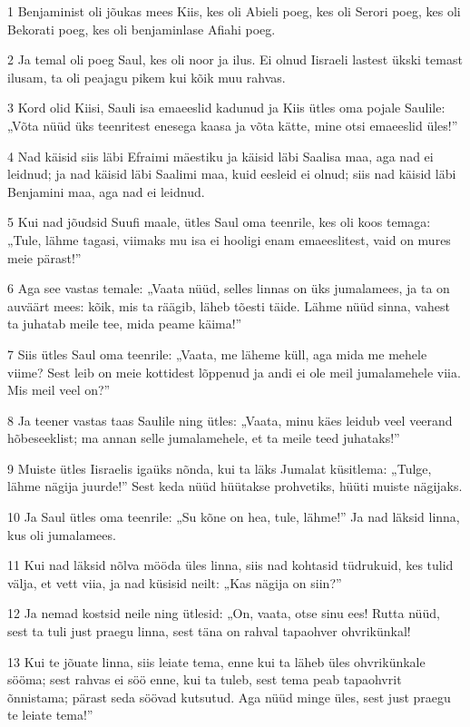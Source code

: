 \par 1 Benjaminist oli jõukas mees Kiis, kes oli Abieli poeg, kes oli Serori poeg, kes oli Bekorati poeg, kes oli benjaminlase Afiahi poeg.
\par 2 Ja temal oli poeg Saul, kes oli noor ja ilus. Ei olnud Iisraeli lastest ükski temast ilusam, ta oli peajagu pikem kui kõik muu rahvas.
\par 3 Kord olid Kiisi, Sauli isa emaeeslid kadunud ja Kiis ütles oma pojale Saulile: „Võta nüüd üks teenritest enesega kaasa ja võta kätte, mine otsi emaeeslid üles!”
\par 4 Nad käisid siis läbi Efraimi mäestiku ja käisid läbi Saalisa maa, aga nad ei leidnud; ja nad käisid läbi Saalimi maa, kuid eesleid ei olnud; siis nad käisid läbi Benjamini maa, aga nad ei leidnud.
\par 5 Kui nad jõudsid Suufi maale, ütles Saul oma teenrile, kes oli koos temaga: „Tule, lähme tagasi, viimaks mu isa ei hooligi enam emaeeslitest, vaid on mures meie pärast!”
\par 6 Aga see vastas temale: „Vaata nüüd, selles linnas on üks jumalamees, ja ta on auväärt mees: kõik, mis ta räägib, läheb tõesti täide. Lähme nüüd sinna, vahest ta juhatab meile tee, mida peame käima!”
\par 7 Siis ütles Saul oma teenrile: „Vaata, me läheme küll, aga mida me mehele viime? Sest leib on meie kottidest lõppenud ja andi ei ole meil jumalamehele viia. Mis meil veel on?”
\par 8 Ja teener vastas taas Saulile ning ütles: „Vaata, minu käes leidub veel veerand hõbeseeklist; ma annan selle jumalamehele, et ta meile teed juhataks!”
\par 9 Muiste ütles Iisraelis igaüks nõnda, kui ta läks Jumalat küsitlema: „Tulge, lähme nägija juurde!” Sest keda nüüd hüütakse prohvetiks, hüüti muiste nägijaks.
\par 10 Ja Saul ütles oma teenrile: „Su kõne on hea, tule, lähme!” Ja nad läksid linna, kus oli jumalamees.
\par 11 Kui nad läksid nõlva mööda üles linna, siis nad kohtasid tüdrukuid, kes tulid välja, et vett viia, ja nad küsisid neilt: „Kas nägija on siin?”
\par 12 Ja nemad kostsid neile ning ütlesid: „On, vaata, otse sinu ees! Rutta nüüd, sest ta tuli just praegu linna, sest täna on rahval tapaohver ohvrikünkal!
\par 13 Kui te jõuate linna, siis leiate tema, enne kui ta läheb üles ohvrikünkale sööma; sest rahvas ei söö enne, kui ta tuleb, sest tema peab tapaohvrit õnnistama; pärast seda söövad kutsutud. Aga nüüd minge üles, sest just praegu te leiate tema!”

